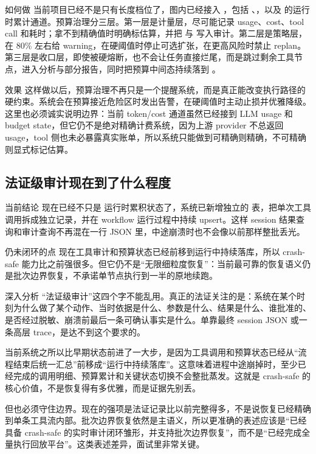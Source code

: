 \documentclass[12pt]{article}
\begin{document}
\begin{qaBox}{如何做}
当前项目已经不是只有长度档位了，图内已经接入 ，包括 、，以及  的运行时累计通道。预算治理分三层。第一层是计量层，尽可能记录 usage、cost、tool call 和耗时；拿不到精确值时明确标估算，并把  与  写入审计。第二层是策略层，在 80\% 左右给 warning，在硬阈值时停止可选扩张，在更高风险时禁止 replan。第三层是收口层，即使被硬熔断，也不会让任务直接烂尾，而是跳过剩余工具节点，进入分析与部分报告，同时把预算中间态持续落到 。
\end{qaBox}

\begin{qaBox}{效果}
这样做以后，预算治理不再只是一个提醒系统，而是真正能改变执行路径的硬约束。系统会在预算接近危险区时发出告警，在硬阈值时主动止损并优雅降级。这里也必须诚实说明边界：当前 token/cost 通道虽然已经接到 LLM usage 和 budget state，但它仍不是绝对精确计费系统，因为上游 provider 不总返回 usage，tool 侧也未必暴露真实账单，所以系统只能做到可精确则精确，不可精确则显式标记估算。
\end{qaBox}

\subsection{法证级审计现在到了什么程度}
\begin{qaBox}{当前结论}
现在已经不只是  运行时累积状态了，系统已新增独立的  表，把单次工具调用拆成独立记录，并在 workflow 运行过程中持续 upsert。这样 session 结果查询和审计查询不再混在一行 JSON 里，中途崩溃时也不会像以前那样整批丢光。
\end{qaBox}

\begin{riskBox}{仍未闭环的点}
现在工具审计和预算状态已经前移到运行中持续落库，所以 crash-safe 能力比之前强很多。但它仍不是“无限细粒度恢复”：当前最可靠的恢复语义仍是批次边界恢复，不承诺单节点执行到一半的原地续跑。
\end{riskBox}

\begin{analysisBox}{深入分析}
“法证级审计”这四个字不能乱用。真正的法证关注的是：系统在某个时刻为什么做了某个动作、当时依据是什么、参数是什么、结果是什么、谁批准的、是否经过脱敏、崩溃前最后一条可确认事实是什么。单靠最终 session JSON 或一条高层 trace，是达不到这个要求的。

当前系统之所以比早期状态前进了一大步，是因为工具调用和预算状态已经从“流程结束后统一汇总”前移成“运行中持续落库”。这意味着进程中途崩掉时，至少已经完成的调用明细、预算累计和关键状态切换不会整批蒸发。这就是 crash-safe 的核心价值，不是恢复得有多优雅，而是证据先别丢。

但也必须守住边界。现在的强项是法证记录比以前完整得多，不是说恢复已经精确到单条工具流内部。批次边界恢复依然是主语义，所以更准确的表述应该是“已经具备 crash-safe 的实时审计闭环雏形，并支持批次边界恢复”，而不是“已经完成全量执行回放平台”。这类表述差异，面试里非常关键。
\end{analysisBox}
\end{document}

